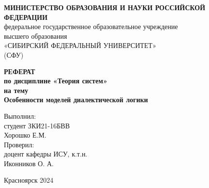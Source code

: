 \documentclass[a4paper,12pt]{report}
\author{}
\renewcommand{\contentsname}{Содержание}
\begin{document}
	
	\title{}
\pagestyle{empty}
	\begin{center}
	 \textbf{МИНИСТЕРСТВО ОБРАЗОВАНИЯ И НАУКИ РОССИЙСКОЙ ФЕДЕРАЦИИ}\\
 федеральное государственное образовательное учреждение\\ высшего образования\\
«СИБИРСКИЙ ФЕДЕРАЛЬНЫЙ УНИВЕРСИТЕТ»\\
(СФУ)\\
\vspace{0.2em}




\end{center}

\vspace{6em}
\begin{center}
	 \bf{ РЕФЕРАТ } \\%
	\vspace{1em} по дисциплине «Теория систем»\\
\vspace{0.5em} на тему \\
\vspace{0.5em} 
\large{Особенности моделей диалектической логики}\\
\end{center}
\vspace{0.5em}
\textsl{}
\vspace{6em}




\begin{flushright}
Выполнил:\\
студент ЗКИ21-16БВВ \\
Хорошко Е.М.\\
\vspace{1.5em}
Проверил:\\
доцент кафедры ИСУ, к.т.н.\\
Иконников О. А.\\
\end{flushright} 
\begin{center}
	\vspace{8em}
	Красноярск 2024
\end{center}

\newpage

\pagestyle{empty} 
\def\contentsname{Содержание}
\tableofcontents

\newpage
\end{document}
